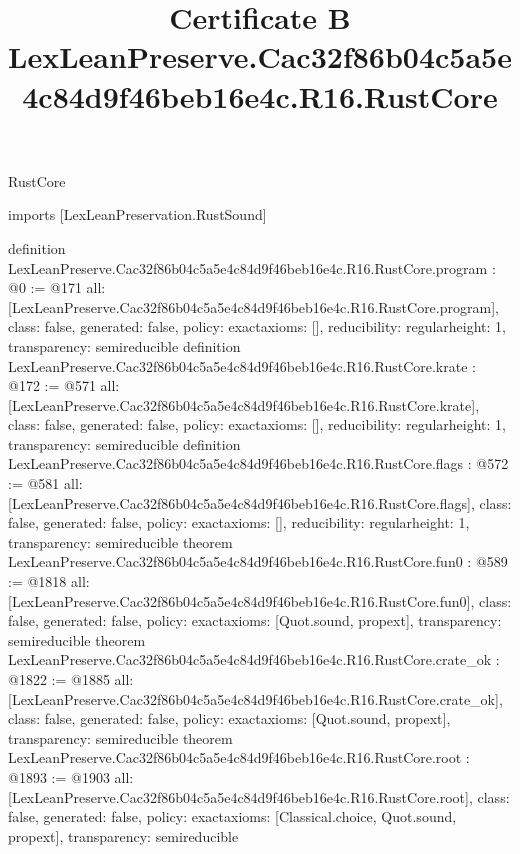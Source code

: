 \begin{lexlean}{RustCore}
\title{Certificate B LexLeanPreserve.Cac32f86b04c5a5e4c84d9f46beb16e4c.R16.RustCore}
\begin{coremodule}
imports [LexLeanPreservation.RustSound]

definition LexLeanPreserve.Cac32f86b04c5a5e4c84d9f46beb16e4c.R16.RustCore.program : @0 := @171 {
  all: [LexLeanPreserve.Cac32f86b04c5a5e4c84d9f46beb16e4c.R16.RustCore.program],
  class: false,
  generated: false,
  policy: exact{axioms: []},
  reducibility: regular{height: 1},
  transparency: semireducible
}
definition LexLeanPreserve.Cac32f86b04c5a5e4c84d9f46beb16e4c.R16.RustCore.krate : @172 := @571 {
  all: [LexLeanPreserve.Cac32f86b04c5a5e4c84d9f46beb16e4c.R16.RustCore.krate],
  class: false,
  generated: false,
  policy: exact{axioms: []},
  reducibility: regular{height: 1},
  transparency: semireducible
}
definition LexLeanPreserve.Cac32f86b04c5a5e4c84d9f46beb16e4c.R16.RustCore.flags : @572 := @581 {
  all: [LexLeanPreserve.Cac32f86b04c5a5e4c84d9f46beb16e4c.R16.RustCore.flags],
  class: false,
  generated: false,
  policy: exact{axioms: []},
  reducibility: regular{height: 1},
  transparency: semireducible
}
theorem LexLeanPreserve.Cac32f86b04c5a5e4c84d9f46beb16e4c.R16.RustCore.fun0 : @589 := @1818 {
  all: [LexLeanPreserve.Cac32f86b04c5a5e4c84d9f46beb16e4c.R16.RustCore.fun0],
  class: false,
  generated: false,
  policy: exact{axioms: [Quot.sound, propext]},
  transparency: semireducible
}
theorem LexLeanPreserve.Cac32f86b04c5a5e4c84d9f46beb16e4c.R16.RustCore.crate_ok : @1822 := @1885 {
  all: [LexLeanPreserve.Cac32f86b04c5a5e4c84d9f46beb16e4c.R16.RustCore.crate_ok],
  class: false,
  generated: false,
  policy: exact{axioms: [Quot.sound, propext]},
  transparency: semireducible
}
theorem LexLeanPreserve.Cac32f86b04c5a5e4c84d9f46beb16e4c.R16.RustCore.root : @1893 := @1903 {
  all: [LexLeanPreserve.Cac32f86b04c5a5e4c84d9f46beb16e4c.R16.RustCore.root],
  class: false,
  generated: false,
  policy: exact{axioms: [Classical.choice, Quot.sound, propext]},
  transparency: semireducible
}


\end{coremodule}
\end{lexlean}
